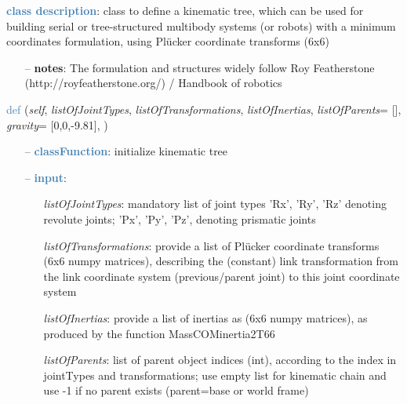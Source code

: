 \begin{itemize}[leftmargin=1.4cm]
\begin{itemize}[leftmargin=0.5cm]
\begin{itemize}[leftmargin=1.4cm]
\begin{itemize}[leftmargin=1.4cm]
\begin{itemize}[leftmargin=0.5cm]
\begin{itemize}[leftmargin=1.4cm]
\begin{itemize}[leftmargin=0.5cm]
\begin{itemize}[leftmargin=1.4cm]
\begin{itemize}[leftmargin=1.4cm]
\begin{itemize}[leftmargin=1.4cm]
%
\noindent\textcolor{steelblue}{{\bf class description}}:  class to define a kinematic tree, which can be used for building serial or tree-structured multibody systems
         (or robots) with a minimum coordinates formulation, using Pl\"ucker coordinate transforms (6x6)
\setlength{\itemindent}{0.7cm}
\begin{itemize}[leftmargin=0.7cm]
  \item[--]  {\bf notes}: The formulation and structures widely follow Roy Featherstone (http://royfeatherstone.org/) / Handbook of robotics \cite{Siciliano2016}\vspace{24pt}\end{itemize}
%
\begin{flushleft}
\noindent \textcolor{steelblue}{def {\bf {}}}\label{sec:kinematicTree:KinematicTree66:__init__}
({\it self}, {\it listOfJointTypes}, {\it listOfTransformations}, {\it listOfInertias}, {\it listOfParents}= [], {\it gravity}= [0,0,-9.81], {\it })
\end{flushleft}
\setlength{\itemindent}{0.7cm}
\begin{itemize}[leftmargin=0.7cm]
  \item[--]  \textcolor{steelblue}{\bf classFunction}: initialize kinematic tree  \item[--]  \textcolor{steelblue}{\bf input}: \vspace{-6pt}
  \begin{itemize}[leftmargin=1.2cm]
\setlength{\itemindent}{-0.7cm}
    \item[] {\it listOfJointTypes}: mandatory list of joint types 'Rx', 'Ry', 'Rz' denoting revolute joints; 'Px', 'Py', 'Pz', denoting prismatic joints
    \item[] {\it   listOfTransformations}: provide a list of Pl\"ucker coordinate transforms (6x6 numpy matrices), describing the (constant) link transformation from the link coordinate system (previous/parent joint) to this joint coordinate system
    \item[] {\it   listOfInertias}: provide a list of inertias as (6x6 numpy matrices), as produced by the function MassCOMinertia2T66
    \item[] {\it   listOfParents}: list of parent object indices (int), according to the index in jointTypes and transformations; use empty list for kinematic chain and use -1 if no parent exists (parent=base or world frame)

\end{itemize}
\end{itemize}
\end{itemize}
\end{itemize}
\end{itemize}
\end{itemize}
\end{itemize}
\end{itemize}
\end{itemize}
\end{itemize}
\end{itemize}
\end{itemize}
